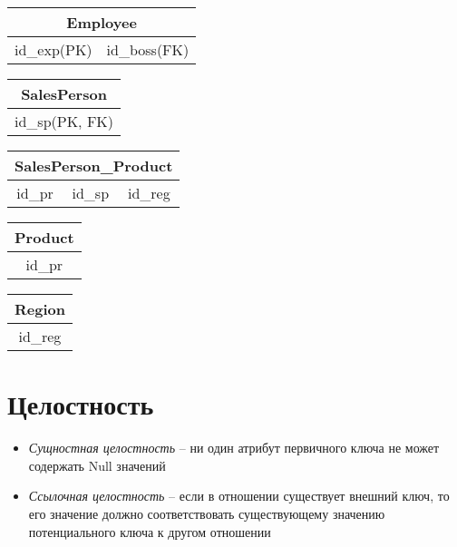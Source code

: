\documentclass[12pt, a4paper]{article}
\begin{document}
\begin{itemize}
    \begin{center}
        \begin{tabular}{|c|c|}
             \hline \multicolumn{2}{|c|}{Employee} \\
             \hline id\_exp(PK) & id\_boss(FK)\\
             \hline
        \end{tabular}
        \begin{tabular}{|c|}
             \hline SalesPerson \\
             \hline id\_sp(PK, FK) \\
             \hline
        \end{tabular}
        \begin{tabular}{|c|c|c|}
             \hline \multicolumn{3}{|c|}{SalesPerson\_Product} \\
             \hline id\_pr & id\_sp & id\_reg \\
             \hline
        \end{tabular}
    \end{center}
    \begin{center}
        \begin{tabular}{|c|}
             \hline Product \\
             \hline id\_pr \\
             \hline
        \end{tabular}
        \begin{tabular}{|c|}
             \hline Region \\
             \hline id\_reg \\
             \hline
        \end{tabular}
    \end{center}
\end{itemize}

\section{Целостность}
\begin{itemize}
\item \emph{Сущностная целостность} -- ни один атрибут первичного ключа не может содержать Null значений
\item \emph{Ссылочная целостность} -- если в отношении существует внешний ключ, то его значение должно соответствовать существующему значению потенциального ключа к другом отношении
\end{itemize}
\end{document}
